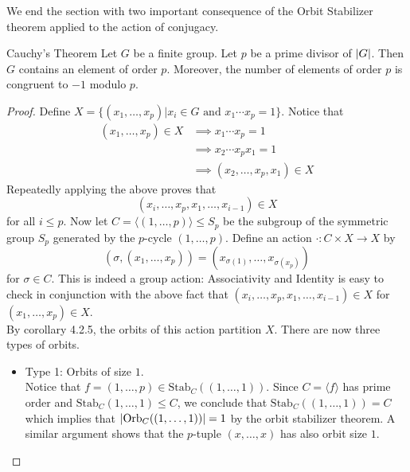 \documentclass[a4paper]{article}
\begin{document}
We end the section with two important consequence of the Orbit Stabilizer theorem applied to the action of conjugacy. 

\begin{thm}{Cauchy's Theorem}{} Let $G$ be a finite group. Let $p$ be a prime divisor of $\abs{G}$. Then $G$ contains an element of order $p$. Moreover, the number of elements of order $p$ is congruent to $-1$ modulo $p$. 
\begin{proof}
Define $X=\{(x_1,\dots,x_p)|x_i\in G\text{ and }x_1\cdots x_p=1\}$. Notice that 
\begin{align*}
(x_1,\dots,x_p)\in X&\implies x_1\cdots x_p=1\\
&\implies x_2\cdots x_px_1=1\\
&\implies(x_2,\dots,x_p,x_1)\in X
\end{align*}
Repeatedly applying the above proves that $$(x_i,\dots,x_p,x_1,\dots,x_{i-1})\in X$$ for all $i\leq p$. Now let $C=\langle(1,\dots,p)\rangle\leq S_p$ be the subgroup of the symmetric group $S_p$ generated by the $p$-cycle $(1,\dots,p)$. Define an action $\cdot:C\times X\to X$ by $$(\sigma,(x_1,\dots,x_p))=(x_{\sigma(1)},\dots,x_{\sigma(x_p)})$$ for $\sigma\in C$. This is indeed a group action: Associativity and Identity is easy to check in conjunction with the above fact that $(x_i,\dots,x_p,x_1,\dots,x_{i-1})\in X$ for $(x_1,\dots,x_p)\in X$. \\

By corollary 4.2.5, the orbits of this action partition $X$. There are now three types of orbits. 
\begin{itemize}
\item Type 1: Orbits of size $1$. \\
Notice that $f=(1,\dots,p)\in\text{Stab}_C((1,\dots,1))$. Since $C=\langle f\rangle$ has prime order and $\text{Stab}_C(1,\dots,1)\leq C$, we conclude that $\text{Stab}_C((1,\dots,1))=C$ which implies that $\abs{\text{Orb}_C((1,\dots,1))}=1$ by the orbit stabilizer theorem. A similar argument shows that the $p$-tuple $(x,\dots,x)$ has also orbit size $1$. \\


\end{itemize}
\end{proof}
\end{thm}
\end{document}
